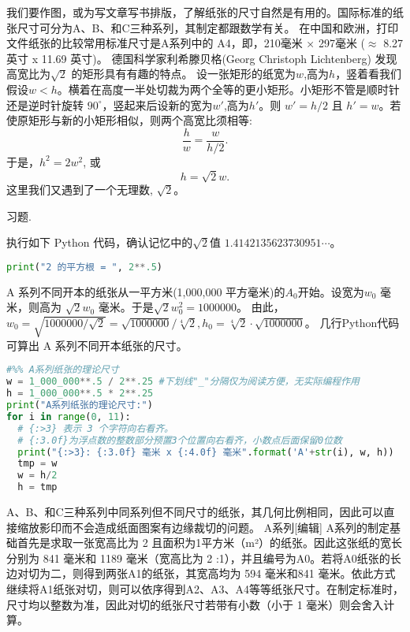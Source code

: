 \documentclass[main.tex]{subfiles}
\begin{document}
我们要作图，或为写文章写书排版，了解纸张的尺寸自然是有用的。国际标准的纸张尺寸可分为A、B、和C三种系列，其制定都跟数学有关。
在中国和欧洲，打印文件纸张的比较常用标准尺寸是A系列中的 A4，即，210毫米 × 297毫米 ($\approx$ 8.27 英寸 x 11.69 英寸)。
 德国科学家利希滕贝格(Georg Christoph Lichtenberg) 发现高宽比为$\sqrt{2}$
的矩形具有有趣的特点。
设一张矩形的纸宽为$w$,高为$h$，竖着看我们假设$w <h$。横着在高度一半处切裁为两个全等的更小矩形。小矩形不管是顺时针还是逆时针旋转 $90^\circ$，竖起来后设新的宽为$w'$,高为$h'$。则
$w' = h/2$ 且 $h' = w$。若使原矩形与新的小矩形相似，则两个高宽比须相等:
$$\frac{h}{w} = \frac{w}{h/2}.   $$
于是，$h^2= 2 w^2$, 或
 $$h= \sqrt{2} w.$$
这里我们又遇到了一个无理数, $\sqrt{2}$。
	
\begin{kaishu}习题.\end{kaishu} 执行如下 Python 代码，确认记忆中的$\sqrt{2}$值 $1.4142135623730951\cdots$。
\begin{spacing}{0.8}
	\begin{lstlisting}[language=Python]
print("2 的平方根 = ", 2**.5)
\end{lstlisting}
\end{spacing}

A 系列不同开本的纸张从一平方米(1,000,000 平方毫米)的$A_0$开始。设宽为$w_0$ 毫米，则高为
$\sqrt{2}w_0$ 毫米。于是$\sqrt{2}w_0^2 = 1000000$。
由此，
$w_0 = \sqrt{1000000/\sqrt{2}}=\sqrt{1000000}/\sqrt[4]{2}, 
h_0=\sqrt[4]{2}\cdot\sqrt{1000000}$。
几行Python代码可算出 A 系列不同开本纸张的尺寸。
\begin{spacing}{0.8}
	\begin{lstlisting}[language=Python]
#%% A系列纸张的理论尺寸
w = 1_000_000**.5 / 2**.25 #下划线"_"分隔仅为阅读方便，无实际编程作用
h = 1_000_000**.5 * 2**.25
print("A系列纸张的理论尺寸:")
for i in range(0, 11):
  # {:>3} 表示 3 个字符向右看齐。
  # {:3.0f}为浮点数的整数部分预置3个位置向右看齐，小数点后面保留0位数
  print("{:>3}: {:3.0f} 毫米 x {:4.0f} 毫米".format('A'+str(i), w, h))
  tmp = w
  w = h/2
  h = tmp	\end{lstlisting}
\end{spacing}



A、B、和C三种系列中同系列但不同尺寸的纸张，其几何比例相同，因此可以直接缩放影印而不会造成纸面图案有边缘裁切的问题。
A系列[编辑]
A系列的制定基础首先是求取一张宽高比为
2
且面积为1平方米（m²）的纸张。因此这张纸的宽长分别为 841 毫米和 1189 毫米（宽高比为
2
:1），并且编号为A0。若将A0纸张的长边对切为二，则得到两张A1的纸张，其宽高均为 594 毫米和841 毫米。依此方式继续将A1纸张对切，则可以依序得到A2、A3、A4等等纸张尺寸。在制定标准时，尺寸均以整数为准，因此对切的纸张尺寸若带有小数（小于 1 毫米）则会舍入计算。
\end{document}
